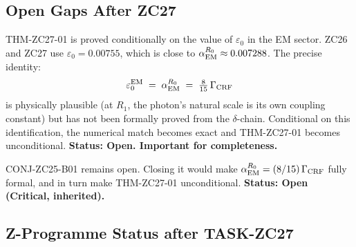 \documentclass[12pt, a4paper]{article}
\begin{document}
\subsection{Open Gaps After ZC27}
\label{zc27:sec:gaps}

\begin{openqbox}[title={GAP-ZC27-01: Derive $\varepsilon_0^{\rm EM}$
  from First Principles}]
THM-ZC27-01 is proved conditionally on the value of
$\varepsilon_0$ in the EM sector.
ZC26 and ZC27 use $\varepsilon_0 = 0.00755$, which is
close to $\alpha_{\rm EM}^{R_0} \approx 0.007288$.
The precise identity:
\[
  \varepsilon_0^{\rm EM} \;=\; \alpha_{\rm EM}^{R_0}
  \;=\; \tfrac{8}{15}\,\Gamma_{\rm CRF}
\]
is physically plausible (at $R_1$, the photon's natural
scale is its own coupling constant) but has not been
formally proved from the $\delta$-chain.
Conditional on this identification, the numerical match
becomes exact and THM-ZC27-01 becomes unconditional.
\textbf{Status: Open. Important for completeness.}
\end{openqbox}

\begin{openqbox}[title={GAP-ZC25-02 (Inherited): Prove
  $\Gamma_{\rm CRF} = \chi$-map Coupling Rate}]
CONJ-ZC25-B01 remains open. Closing it would make
$\alpha_{\rm EM}^{R_0} = (8/15)\,\Gamma_{\rm CRF}$ fully
formal, and in turn make THM-ZC27-01 unconditional.
\textbf{Status: Open (Critical, inherited).}
\end{openqbox}

\subsection{Z-Programme Status after TASK-ZC27}
\label{zc27:sec:status}
\end{document}
